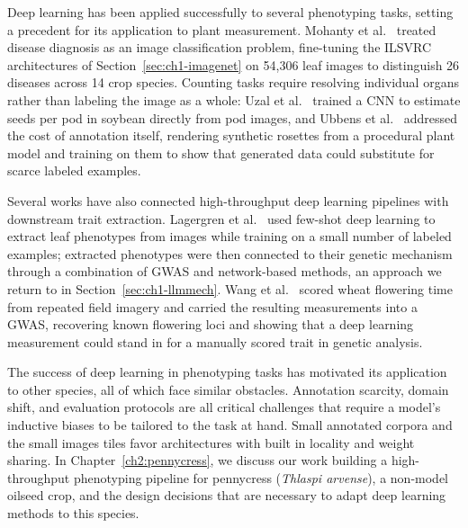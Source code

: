 Deep learning has been applied successfully to several phenotyping tasks, setting a precedent for its application to plant measurement. Mohanty et al.~\cite{mohanty2016plantdisease} treated disease diagnosis as an image classification problem, fine-tuning the ILSVRC architectures of Section~\ref{sec:ch1-imagenet} on 54,306 leaf images to distinguish 26 diseases across 14 crop species. Counting tasks require resolving individual organs rather than labeling the image as a whole: Uzal et al.~\cite{seed-cnn} trained a CNN to estimate seeds per pod in soybean directly from pod images, and Ubbens et al.~\cite{ubbens2018leafcounting} addressed the cost of annotation itself, rendering synthetic rosettes from a procedural plant model and training on them to show that generated data could substitute for scarce labeled examples.

Several works have also connected high-throughput deep learning pipelines with downstream trait extraction. Lagergren et al.~\cite{lagergren2023fewshot} used few-shot deep learning to extract leaf phenotypes from images while training on a small number of labeled examples; extracted phenotypes were then connected to their genetic mechanism through a combination of GWAS and network-based methods, an approach we return to in Section~\ref{sec:ch1-llmmech}. Wang et al.~\cite{wang2019high} scored wheat flowering time from repeated field imagery and carried the resulting measurements into a GWAS, recovering known flowering loci and showing that a deep learning measurement could stand in for a manually scored trait in genetic analysis.

The success of deep learning in phenotyping tasks has motivated its application to other species, all of which face similar obstacles. Annotation scarcity, domain shift, and evaluation protocols are all critical challenges that require a model's inductive biases to be tailored to the task at hand. Small annotated corpora and the small images tiles favor architectures with built in locality and weight sharing. In Chapter~\ref{ch2:pennycress}, we discuss our work building a high-throughput phenotyping pipeline for pennycress (\textit{Thlaspi arvense}), a non-model oilseed crop, and the design decisions that are necessary to adapt deep learning methods to this species.

